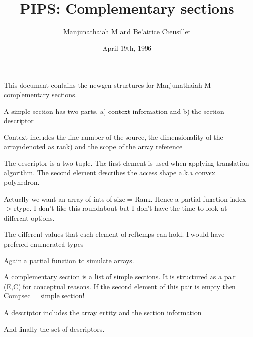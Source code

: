 \documentclass{article}
\title{PIPS: Complementary sections}
\author{Manjunathaiah M and Be'atrice Creusillet}
\date{April 19th, 1996}
\begin{document}
\sloppy

This document contains the newgen structures for Manjunathaiah M
complementary sections.

{}

{}
{}

{}
A simple section has two parts. a) context information and 
b) the section descriptor

{}
Context includes the line number of the source, the dimensionality
of the array(denoted as rank) and the scope of the array reference

{}
The descriptor is a two tuple. The first element is used when
applying translation algorithm. The second element describes
the access shape a.k.a convex polyhedron.

{}
Actually we want an array of ints of size = Rank. Hence a partial
function index -> rtype. I don't like this roundabout but I don't
have the time to look at different options. 

{}
The different values that each element of reftemps can hold.
I would have prefered enumerated types.

{}
Again a partial function to simulate arrays.

{}
A complementary section is a list of simple sections.
It is structured as a pair (E,{C}) for conceptual reasons.
If the second element of this pair is empty then Compsec = simple section!

{}
A descriptor includes the array entity and the section information

{}
And finally the set of descriptors.
\end{document}
